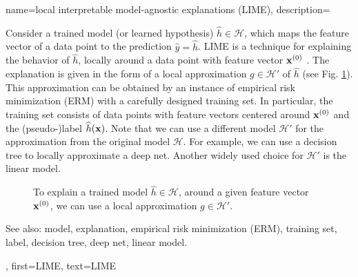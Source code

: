 {
{name={local interpretable model-agnostic explanations (LIME)},
	description={Consider 
		a trained model (or learned hypothesis) $\widehat{h} \in \mathcal{H}$, 
		which maps the feature vector of a data point to the prediction $\widehat{y}= \widehat{h}$. 
		LIME is a technique for explaining the behavior of $\widehat{h}$, locally around a data point with feature vector ${\bf x}^{(0)}$ \cite{Ribeiro2016}. 
		The explanation is given in the form of a local approximation $g \in \mathcal{H}'$ of $\widehat{h}$ 
		(see Fig. \ref{fig_lime_dict}). This approximation can be obtained by an instance of empirical risk minimization (ERM) 
		with a carefully designed training set. In particular, the training set consists of data points with 
		feature vectors centered around ${\bf x}^{(0)}$ and the (pseudo-)label $\widehat{h}({\bf x})$. 
		Note that we can use a different model $\mathcal{H}'$ for the approximation from 
		the original model $\mathcal{H}$. For example, we can use a decision tree 
		to locally approximate a deep net. Another widely used choice for $\mathcal{H}'$ is 
		the linear model. 
		\begin{figure}[H]
		\begin{center}
		\end{center}
		\caption{To explain a trained model $\widehat{h} \in \mathcal{H}$, around a 
		given feature vector ${\bf x}^{(0)}$, we can use a local approximation $g \in \mathcal{H}'$. }
		\label{fig_lime_dict}
		\end{figure}
		See also: model, explanation, empirical risk minimization (ERM), training set, label, decision tree, deep net, linear model.},
	first={LIME},
	text={LIME}
}



}
